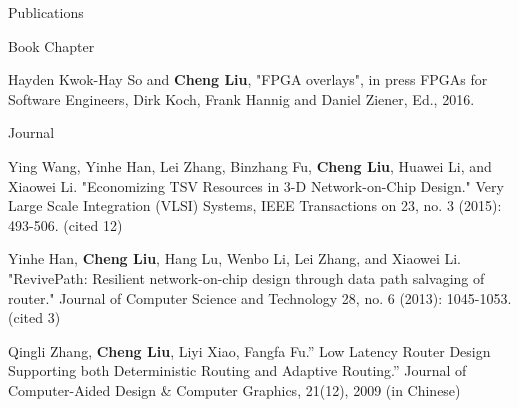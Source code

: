\documentclass{resume} %
\begin{document}
\begin{rSection}{Publications}
    \begin{rSubsection} {Book Chapter}{}{}{}
    \item Hayden Kwok-Hay So and \textbf{Cheng Liu}, "FPGA overlays", in press FPGAs for Software
        Engineers, Dirk Koch, Frank Hannig and Daniel Ziener, Ed., 2016.  
    \end{rSubsection}

    \begin{rSubsection} {Journal}{}{}{}
    \item Ying Wang, Yinhe Han, Lei Zhang, Binzhang Fu, \textbf{Cheng Liu}, Huawei Li, and Xiaowei Li.
        "Economizing TSV Resources in 3-D Network-on-Chip Design." Very Large Scale Integration
        (VLSI) Systems, IEEE Transactions on 23, no. 3 (2015): 493-506. (cited 12)  
    \item Yinhe Han, \textbf{Cheng Liu}, Hang Lu, Wenbo Li, Lei Zhang, and Xiaowei Li. "RevivePath:
        Resilient network-on-chip design through data path salvaging of router." Journal of Computer
        Science and Technology 28, no. 6 (2013): 1045-1053. (cited 3)
    \item Qingli Zhang, \textbf{Cheng Liu}, Liyi Xiao, Fangfa Fu.” Low Latency Router Design Supporting both
        Deterministic Routing and Adaptive Routing.” Journal of Computer-Aided Design \& Computer
        Graphics, 21(12), 2009 (in Chinese)
    \end{rSubsection}


\end{rSection}
\end{document}

